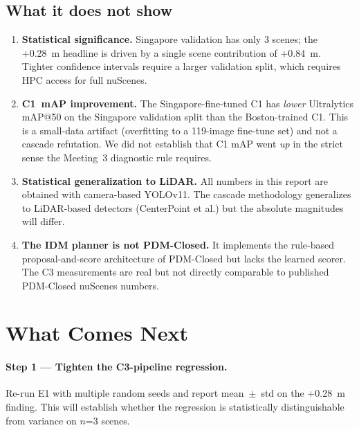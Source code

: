 \documentclass[11pt,a4paper]{article}
\begin{document}
\subsection{What it does not show}

\begin{enumerate}[noitemsep]
    \item \textbf{Statistical significance.} Singapore validation has
          only 3 scenes; the +0.28~m headline is driven by a single
          scene contribution of +0.84~m. Tighter confidence intervals
          require a larger validation split, which requires HPC
          access for full nuScenes.
    \item \textbf{C1~mAP improvement.} The Singapore-fine-tuned C1 has
          \emph{lower} Ultralytics mAP@50 on the Singapore validation
          split than the Boston-trained C1. This is a small-data
          artifact (overfitting to a 119-image fine-tune set) and not
          a cascade refutation. We did not establish that C1 mAP went
          \emph{up} in the strict sense the Meeting~3 diagnostic rule
          requires.
    \item \textbf{Statistical generalization to LiDAR.} All numbers in
          this report are obtained with camera-based YOLOv11. The
          cascade methodology generalizes to LiDAR-based detectors
          (CenterPoint et al.) but the absolute magnitudes will
          differ.
    \item \textbf{The IDM planner is not PDM-Closed.} It implements
          the rule-based proposal-and-score architecture of
          PDM-Closed but lacks the learned scorer. The C3
          measurements are real but not directly comparable to
          published PDM-Closed nuScenes numbers.
\end{enumerate}

\section{What Comes Next}

\paragraph{Step 1 --- Tighten the C3-pipeline regression.} Re-run E1
with multiple random seeds and report mean~$\pm$~std on the +0.28~m
finding. This will establish whether the regression is statistically
distinguishable from variance on $n$=3 scenes.
\end{document}
